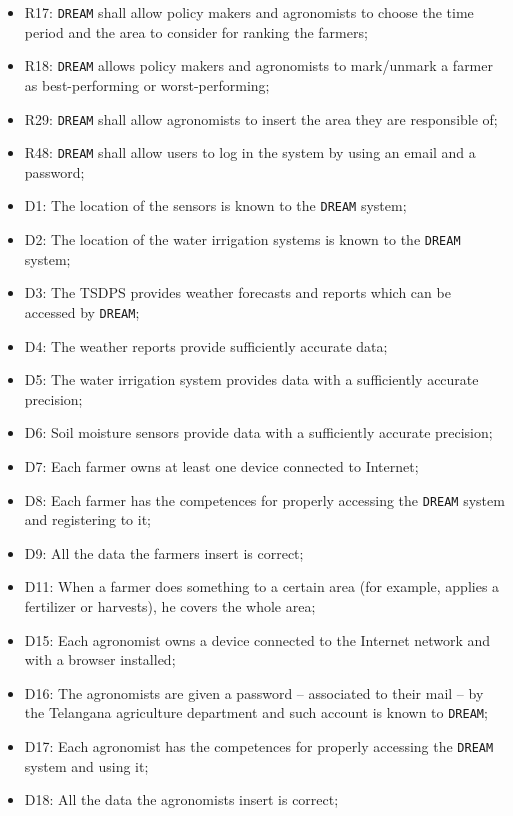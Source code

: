 \documentclass{article}
\begin{document}
\begin{itemize}
    \item R17: \verb|DREAM| shall allow policy makers and agronomists to choose the time period and the area to consider for ranking the farmers;
    
    \item R18: \verb|DREAM| allows policy makers and agronomists to mark/unmark a farmer as best-performing or worst-performing;
    
    \item R29: \verb|DREAM| shall allow agronomists to insert the area they are responsible of;
    
    \item R48: \verb|DREAM| shall allow users to log in the system by using an email and a password;
    
    \item D1: The location of the sensors is known to the \verb|DREAM| system;
    
    \item D2: The location of the water irrigation systems is known to the \verb|DREAM| system;
    
    \item D3: The TSDPS provides weather forecasts and reports which can be accessed by \verb|DREAM|;
    
    \item D4: The weather reports provide sufficiently accurate data;
    
    \item D5: The water irrigation system provides data with a sufficiently accurate precision;
    
    \item D6: Soil moisture sensors provide data with a sufficiently accurate precision;
    
    \item D7: Each farmer owns at least one device connected to Internet;
    
    \item D8: Each farmer has the competences for properly accessing the \verb|DREAM| system and registering to it;
    
    \item D9: All the data the farmers insert is correct;
    
    \item D11: When a farmer does something to a certain area (for example, applies a fertilizer or harvests), he covers the whole area;
    
    \item D15: Each agronomist owns a device connected to the Internet network and with a browser installed;

    \item D16: The agronomists are given a password – associated to their mail – by the Telangana agriculture department and such account is known to \verb|DREAM|;

    \item D17: Each agronomist has the competences for properly accessing the \verb|DREAM| system and using it;
  
    \item D18: All the data the agronomists insert is correct;
\end{itemize}
\end{document}
